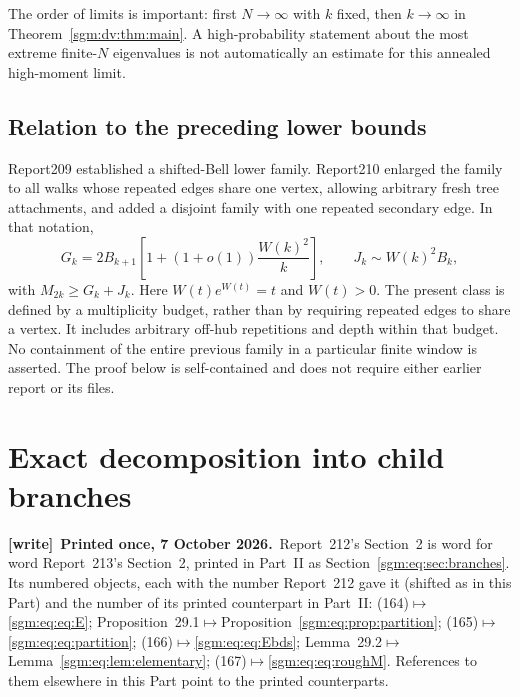 \documentclass[11pt,letterpaper]{article}
\theoremstyle{remark}\newtheorem{remark}[theorem]{Remark}
\newenvironment{writenote}[1][]{\par\smallskip\begingroup\small
 \noindent\textbf{[write]}\if\relax\detokenize{#1}\relax\else~\textbf{#1.}\fi\ }%
 {\par\endgroup\smallskip}
\theoremstyle{definition}\newtheorem{definition}[theorem]{Definition}
\begin{document}
The order of limits is important: first $N\to\infty$ with $k$ fixed, then $k\to\infty$ in Theorem~\ref{sgm:dv:thm:main}. A high-probability statement about the most extreme finite-$N$ eigenvalues is not automatically an estimate for this annealed high-moment limit.

\subsection{Relation to the preceding lower bounds}
Report209 established a shifted-Bell lower family. Report210 enlarged the family to all walks whose repeated edges share one vertex, allowing arbitrary fresh tree attachments, and added a disjoint family with one repeated secondary edge. In that notation,
\[
 G_k=2B_{k+1}\left[1+(1+o(1))\frac{W(k)^2}{k}\right],
 \qquad J_k\sim W(k)^2B_k,
\]
with $M_{2k}\ge G_k+J_k$. Here $W(t)e^{W(t)}=t$ and $W(t)>0$.
The present class is defined by a multiplicity budget, rather than by requiring repeated edges to share a vertex. It includes arbitrary off-hub repetitions and depth within that budget. No containment of the entire previous family in a particular finite window is asserted. The proof below is self-contained and does not require either earlier report or its files.

\section{Exact decomposition into child branches}\label{sgm:dv:sec:branches}
\begin{writenote}[Printed once, 7 October 2026]Report~212's Section~2 is word for word Report~213's Section~2, printed in Part~II as Section~\ref{sgm:eq:sec:branches}. Its numbered objects, each with the number Report~212 gave it (shifted as in this Part) and the number of its printed counterpart in Part~II: (164)${}\mapsto{}$\eqref{sgm:eq:eq:E}; Proposition~29.1${}\mapsto{}$Proposition~\ref{sgm:eq:prop:partition}; (165)${}\mapsto{}$\eqref{sgm:eq:eq:partition}; (166)${}\mapsto{}$\eqref{sgm:eq:eq:Ebds}; Lemma~29.2${}\mapsto{}$Lemma~\ref{sgm:eq:lem:elementary}; (167)${}\mapsto{}$\eqref{sgm:eq:eq:roughM}. References to them elsewhere in this Part point to the printed counterparts.
\end{writenote}
\addtocounter{equation}{4}%
\end{document}
